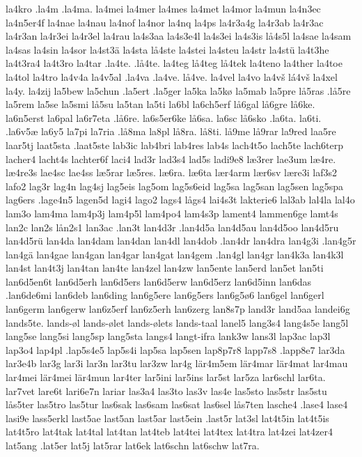 {{la4kro
.la4m
.la4ma.
la4mei
la4mer
la4mes
la4met
la4mor
la4mun
la4n3ec
la4n5er4f
la4nae
la4nau
la4nof
la4nor
la4nq
la4ps
la4r3a4g
la4r3ab
la4r3ac
la4r3an
la4r3ei
la4r3el
la4rau
la4s3aa
la4s3e4l
la4s3ei
la4s3is
lå4s5l
la4sae
la4sam
la4sas
la4sin
la4sor
la4st3ä
la4sta
lå4ste
la4stei
la4steu
la4str
la4stü
la4t3he
la4t3ra4
la4t3ro
la4tar
.la4te.
.lå4te.
la4teg
lå4teg
lå4tek
la4teno
la4ther
la4toe
la4tol
la4tro
la4v4a
la4v5al
.la4va
.la4ve.
lå4ve.
la4vel
la4vo
la4vš
lá4vš
la4xel
la4y.
la4zij
la5bew
la5chun
.la5ert
.la5ger
la5ka
la5kø
la5mab
la5pre
lå5ras
.lå5re
la5rem
la5se
la5smi
lå5su
la5tan
la5ti
la6bl
la6ch5erf
lå6gal
lå6gre
lå6ke.
la6n5erst
la6pal
la6r7eta
.lå6re.
la6s5er6ke
lå6sa.
la6sc
lå6sko
.la6ta.
la6ti.
.la6v5æ
la6y5
la7pi
la7ria
.lå8ma
la8pl
lå8ra.
lå8ti.
lå9me
lå9rar
la9red
laa5re
laar5tj
laat5sta
.laat5ste
lab3ic
lab4bri
lab4res
lab4s
lach4t5o
lach5te
lach6terp
lacher4
lacht4s
lachter6f
laci4
lad3r
lad3s4
lad5s
ladi9e8
læ3rer
lae3um
læ4re.
læ4re3s
lae4sc
lae4ss
læ5rar
læ5res.
læ6ra.
læ6ta
lær4arm
lær6sv
lære3i
laf3s2
lafo2
lag3r
lag4n
lag4sj
lag5eis
lag5om
lag5s6eid
lag5sa
lag5san
lag5sen
lag5spa
lag6ers
.lage4n5
lagen5d
lagi4
lago2
lags4
lågs4
lai4s3t
lakterie6
lal3ab
lal4la
lal4o
lam3o
lam4ma
lam4p3j
lam4p5l
lam4po4
lam4s3p
lament4
lammen6ge
lamt4s
lan2c
lan2s
lån2s1
lan3ac
.lan3t
lan4d3r
.lan4d5a
lan4d5au
lan4d5oo
lan4d5ru
lan4d5rü
lan4da
lan4dam
lan4dan
lan4dl
lan4dob
.lan4dr
lan4dra
lan4g3i
.lan4g5r
lan4gä
lan4gae
lan4gan
lan4gar
lan4gat
lan4gem
.lan4gl
lan4gr
lan4k3a
lan4k3l
lan4st
lan4t3j
lan4tan
lan4te
lan4zel
lan4zw
lan5ente
lan5erd
lan5et
lan5ti
lan6d5en6t
lan6d5erh
lan6d5ers
lan6d5erw
lan6d5erz
lan6d5inn
lan6das
.lan6de6mi
lan6deb
lan6ding
lan6g5ere
lan6g5ers
lan6g5ø6
lan6gel
lan6gerl
lan6germ
lan6gerw
lan6z5erf
lan6z5erh
lan6zerg
lan8s7p
land3r
land5aa
landei6g
lands5te.
lands-øl
lands-ølet
lands-ølets
lands-taal
lanel5
lang3s4
lang4s5e
lang5l
lang5se
lang5si
lang5sp
lang5sta
langs4
langt-ifra
lank3w
lans3l
lap3ac
lap3l
lap3o4
lap4pl
.lap5s4e5
lap5s4i
lap5sa
lap5sen
lap8p7r8
lapp7s8
.lapp8e7
lar3da
lar3e4b
lar3g
lar3i
lar3n
lar3tu
lar3zw
lar4g
lär4m5em
lär4mar
lär4mat
lar4mau
lar4mei
lär4mei
lär4mun
lar4ter
lar5ini
lar5ins
lar5st
lar5za
lar6schl
lar6ta.
lar7vet
lare6t
lari6e7n
lariar
las3a4
las3to
las3v
las4e
las5sto
las5str
las5stu
lås5ter
las5tro
las5tur
las6sak
las6sam
las6sat
las6sel
lås7ten
lasche4
.lase4
lase4
lasi9e
lass5erkl
last5ae
last5an
last5ar
last5ein
.last5r
lat3sl
lat4t5in
lat4t5is
lat4t5ro
lat4tak
lat4tal
lat4tan
lat4teb
lat4tei
lat4tex
lat4tra
lat4zei
lat4zer4
lat5ang
.lat5er
lat5j
lat5rar
lat6ek
lat6schn
lat6schw
lat7ra.
}}
